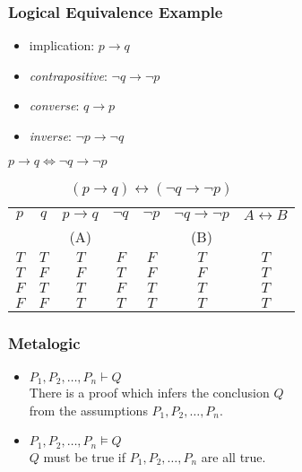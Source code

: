 \documentclass[dvipsnames]{beamer}
\begin{document}
\begin{frame}
  \frametitle{Logical Equivalence Example}

  \begin{itemize}
    \item implication: $p \rightarrow q$
    \item \emph{contrapositive}: $\neg q \rightarrow \neg p$
    \item \emph{converse}: $q \rightarrow p$
    \item \emph{inverse}: $\neg p \rightarrow \neg q$
  \end{itemize}

  \pause
  \medskip
  $p \rightarrow q \Leftrightarrow \neg q \rightarrow \neg p$

  \vspace{-12pt}
  \begin{table}
    \caption{$(p \rightarrow q) \leftrightarrow (\neg q \rightarrow \neg p)$}
    \begin{tabular}{|c|c|c|c|c|c||c|}\hline
      $p$ &   $q$    & $p \rightarrow q$
          & $\neg q$ & $\neg p$ & $\neg q \rightarrow \neg p$ & $A \leftrightarrow B$\\
          &     & (A)               &          &          & (B)
          &\\\hline\hline
      $T$ & $T$ & $T$ & $F$ & $F$ & $T$ & $T$\\\hline
      $T$ & $F$ & $F$ & $T$ & $F$ & $F$ & $T$\\\hline
      $F$ & $T$ & $T$ & $F$ & $T$ & $T$ & $T$\\\hline
      $F$ & $F$ & $T$ & $T$ & $T$ & $T$ & $T$\\\hline
    \end{tabular}
  \end{table}
\end{frame}

\begin{frame}
  \frametitle{Metalogic}

  \begin{itemize}
    \item $P_1,P_2,\dots,P_n \vdash Q$\\
      \smallskip
      There is a proof which infers the conclusion $Q$\\
      from the assumptions $P_1,P_2,\dots,P_n$.

    \pause
    \medskip
    \item $P_1,P_2,\dots,P_n \vDash Q$\\
      \smallskip
      $Q$ must be true if $P_1,P_2,\dots,P_n$ are all true.
  \end{itemize}
\end{frame}
\end{document}

